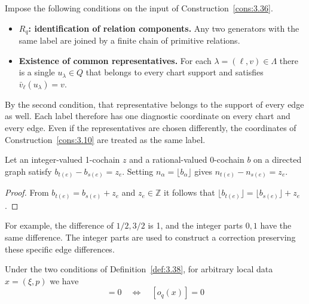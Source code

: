 \begin{definition}\label{def:3.38}

Impose the following conditions on the input of Construction~\ref{cons:3.36}.

\begin{itemize}
\item \textbf{$R_q$: identification of relation components.} Any two generators with
the same label are joined by a finite chain of primitive relations.
\item \textbf{Existence of common representatives.} For each
$\lambda=(\ell,v)\in\Lambda$ there is a single $u_\lambda\in Q$ that belongs to
every chart support and satisfies $\bar v_\ell(u_\lambda)=v$.
\end{itemize}

By the second condition, that representative belongs to the support of every edge as
well.
Each label therefore has one diagnostic coordinate on every chart and every edge.
Even if the representatives are chosen differently, the coordinates of
Construction~\ref{cons:3.10} are treated as the same label.

\end{definition}

\begin{lemma}\label{lem:3.39}

Let an integer-valued 1-cochain $z$ and a rational-valued 0-cochain $b$ on a
directed graph satisfy $b_{t(e)}-b_{s(e)}=z_e$.
Setting $n_\alpha=\lfloor b_\alpha\rfloor$ gives
$n_{t(e)}-n_{s(e)}=z_e$.

\end{lemma}

\begin{proof}

From $b_{t(e)}=b_{s(e)}+z_e$ and $z_e\in\mathbb{Z}$ it follows that
$\lfloor b_{t(e)}\rfloor=\lfloor b_{s(e)}\rfloor+z_e$.

\end{proof}

For example, the difference of $1/2,3/2$ is 1, and the integer parts $0,1$ have the
same difference.
The integer parts are used to construct a correction preserving these specific edge
differences.

\begin{theorem}\label{thm:3.40}

Under the two conditions of Definition~\ref{def:3.38}, for arbitrary local data
$x=(\xi,p)$ we have
\begin{equation*}
[a_q(x)]=0
\quad\Longleftrightarrow\quad
[o_q(x)]=0
\tag{3.34}\label{eq:3.34}
\end{equation*}
\end{theorem}


